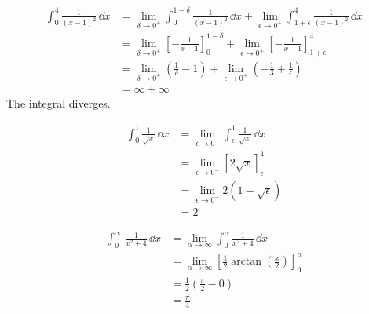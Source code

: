 


\begin{Solution}
  \label{solution int 0 4 1 / (x-1)2}
  \begin{align*}
    \int_0^4 \frac{1}{(x-1)^2} \,\dd x
    &= \lim_{\delta \to 0^+} \int_0^{1-\delta}
    \frac{1}{(x-1)^2} \, \dd x +
    \lim_{\epsilon \to 0^+} \int_{1+\epsilon}^4
    \frac{1}{(x-1)^2} \, \dd x \\
    &= \lim_{\delta \to 0^+} \left[-\frac{1}{x-1}\right]_0^{1-\delta} +
    \lim_{\epsilon \to 0^+}
    \left[-\frac{1}{x-1}\right]_{1+\epsilon}^4  \\
    &= \lim_{\delta \to 0^+} \left( \frac{1}{\delta} - 1 \right) +
    \lim_{\epsilon \to 0^+} \left( -\frac{1}{3} +
      \frac{1}{\epsilon} \right) \\
    &= \infty + \infty
  \end{align*}
  The integral diverges.
\end{Solution}



\begin{Solution}
  \label{solution int 0 1 1 / sqrt x}
  \begin{align*}
    \int_0^1 \frac{1}{\sqrt{x}} \,\dd x
    &= \lim_{\epsilon \to 0^+} \int_\epsilon^1 \frac{1}{\sqrt{x}} \,\dd x \\
    &= \lim_{\epsilon \to 0^+} \left[ 2 \sqrt{x}
    \right]_\epsilon^1 \\
    &= \lim_{\epsilon \to 0^+} 2 ( 1 - \sqrt{\epsilon} ) \\
    &= 2
  \end{align*}
\end{Solution}



\begin{Solution}
  \label{solution int 0 infty 1 / x2+4}
  \begin{align*}
    \int_0^\infty \frac{1}{x^2+4} \,\dd x
    &= \lim_{\alpha \to \infty} \int_0^\alpha \frac{1}{x^2+4} \,\dd x \\
    &= \lim_{\alpha \to \infty} \left[ \frac{1}{2} \arctan
      \left( \frac{x}{2} \right) \right]_0^\alpha \\
    &= \frac{1}{2} \left( \frac{\pi}{2} - 0 \right) \\
    &= \frac{\pi}{4}
  \end{align*}
\end{Solution}








